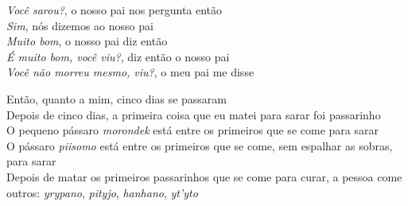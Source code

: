 \bigskip

\begin{linenumbers}\begingroup\raggedright
 
\noindent \textit{Você sarou?}, o nosso pai nos pergunta então\\
 \textit{Sim}, nós dizemos ao nosso pai\\
 \textit{Muito bom}, o nosso pai diz então\\
 \textit{É muito bom, você viu?}, diz então o nosso pai\\
 \textit{Você não morreu mesmo, viu?}, o meu pai me disse
 
\end{linenumbers}\endgroup

\bigskip

\begin{linenumbers}\begingroup\raggedright
 
\noindent Então, quanto a mim, cinco dias se passaram\\
 Depois de cinco dias, a primeira coisa que eu matei para sarar foi passarinho\\
 O pequeno pássaro \textit{morondek} está entre os primeiros que se come para sarar\\
 O pássaro \textit{piisomo} está entre os primeiros que se come, sem
 espalhar as sobras, para sarar\\
 Depois de matar os primeiros passarinhos que se come para curar, a
 pessoa come outros: \textit{yrypano}, \textit{pityjo}, \textit{hanhano},
 \textit{yt'yto}
 
\end{linenumbers}\endgroup

\bigskip

